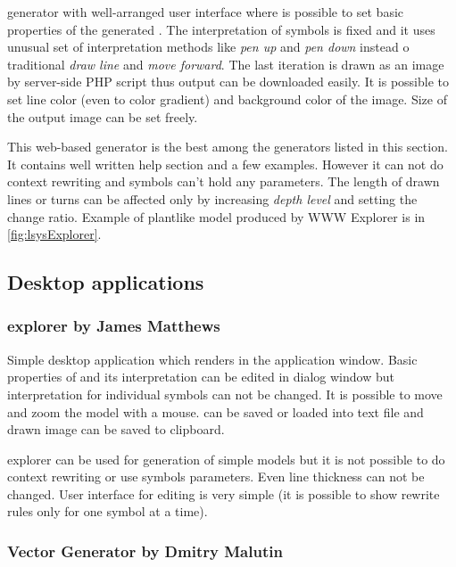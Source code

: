 \noindent
\lsystem generator with well-arranged user interface where is possible to set basic properties of the generated \lsystems.
The interpretation of symbols is fixed and it uses unusual set of interpretation methods like \emph{pen up} and \emph{pen down} instead o traditional \emph{draw line} and \emph{move forward}.
The last iteration is drawn as an image by server-side PHP script thus output can be downloaded easily.
It is possible to set line color (even to color gradient) and background color of the image.
Size of the output image can be set freely.

This web-based generator is the best among the generators listed in this section.
It contains well written help section and a few examples.
However it can not do context rewriting and symbols can't hold any parameters.
The length of drawn lines or turns can be affected only by increasing \emph{depth level} and setting the change ratio.
Example of plantlike model produced by WWW \lsystem Explorer is in \autoref{fig:lsysExplorer}.




\subsection{Desktop applications}
\label{sec:DesktopGenerators}

\subsubsection{\lsystems explorer by James Matthews}
\label{sec:LsystemExplorer}

\noindent
Simple desktop application which renders \lsystems in the application window.
Basic properties of \lsystem and its interpretation can be edited in dialog window but interpretation for individual symbols can not be changed.
It is possible to move and zoom the model with a mouse.
\lsystems can be saved or loaded into text file and drawn image can be saved to clipboard.

\lsystems explorer can be used for generation of simple models but it is not possible to do context rewriting or use symbols parameters.
Even line thickness can not be changed.
User interface for editing \lsystem is very simple (it is possible to show rewrite rules only for one symbol at a time).


\subsubsection{\lsystem Vector Generator by Dmitry Malutin}


